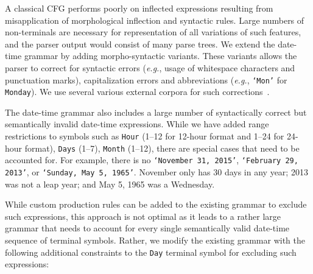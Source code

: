 A classical CFG performs poorly on inflected expressions resulting from misapplication of morphological inflection and syntactic rules. Large numbers of non-terminals are necessary for representation of all variations of such features, and the parser output would consist of many parse trees. We extend the date-time grammar by adding morpho-syntactic variants. These variants allows the parser to correct for syntactic errors (\textit{e.g.}, usage of whitespace characters and punctuation marks), capitalization errors and abbreviations (\textit{e.g.}, \texttt{`Mon'} for \texttt{Monday}). We use several various external corpora for such corrections~\cite{nltkcorpora}.

The date-time grammar also includes a large number of syntactically correct but semantically invalid date-time expressions. While we have added range restrictions to symbols such as \texttt{Hour} (1--12 for 12-hour format and 1--24 for 24-hour format), \texttt{Days} (1--7), \texttt{Month} (1--12), there are special cases that need to be accounted for. For example, there is no  \texttt{`November 31, 2015'}, \texttt{`February 29, 2013'}, or \texttt{`Sunday, May  5, 1965'}. November only has 30 days in any year; 2013 was not a leap year; and May 5, 1965 was a Wednesday.

While custom production rules can be added to the existing grammar to exclude such expressions, this approach is not optimal as it leads to a rather large grammar that needs to account for every single semantically valid date-time sequence of terminal symbols. Rather, we modify the existing grammar with the following additional constraints to the \texttt{Day} terminal symbol for excluding such expressions:

